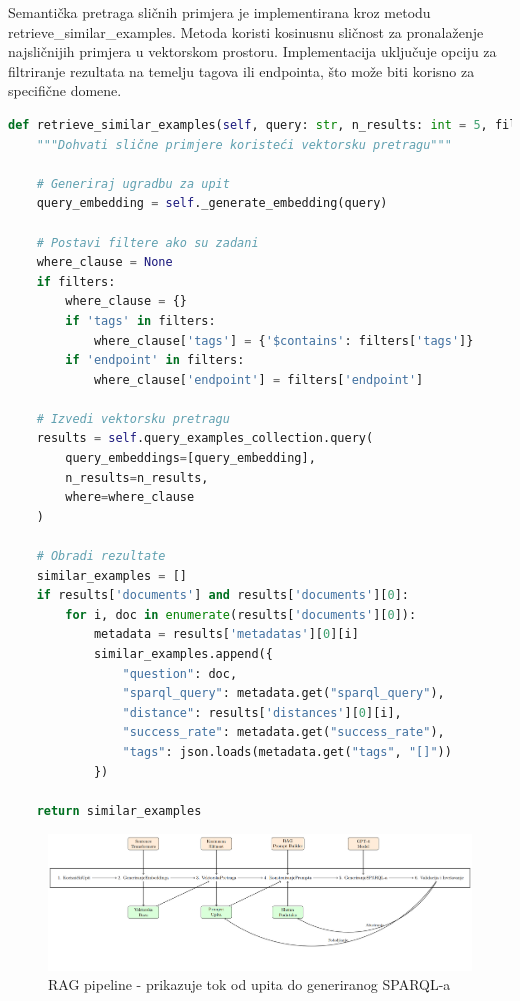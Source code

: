 Semantička pretraga sličnih primjera je implementirana kroz metodu retrieve\_similar\_examples. Metoda koristi kosinusnu sličnost za pronalaženje najsličnijih primjera u vektorskom prostoru. Implementacija uključuje opciju za filtriranje rezultata na temelju tagova ili endpointa, što može biti korisno za specifične domene.

\begin{lstlisting}[language=Python, caption=Implementacija semantičke pretrage]
def retrieve_similar_examples(self, query: str, n_results: int = 5, filters: Dict = None) -> List[Dict[str, Any]]:
    """Dohvati slične primjere koristeći vektorsku pretragu"""
    
    # Generiraj ugradbu za upit
    query_embedding = self._generate_embedding(query)
    
    # Postavi filtere ako su zadani
    where_clause = None
    if filters:
        where_clause = {}
        if 'tags' in filters:
            where_clause['tags'] = {'$contains': filters['tags']}
        if 'endpoint' in filters:
            where_clause['endpoint'] = filters['endpoint']
    
    # Izvedi vektorsku pretragu
    results = self.query_examples_collection.query(
        query_embeddings=[query_embedding],
        n_results=n_results,
        where=where_clause
    )
    
    # Obradi rezultate
    similar_examples = []
    if results['documents'] and results['documents'][0]:
        for i, doc in enumerate(results['documents'][0]):
            metadata = results['metadatas'][0][i]
            similar_examples.append({
                "question": doc,
                "sparql_query": metadata.get("sparql_query"),
                "distance": results['distances'][0][i],
                "success_rate": metadata.get("success_rate"),
                "tags": json.loads(metadata.get("tags", "[]"))
            })
    
    return similar_examples
\end{lstlisting}

\begin{figure}[h!]
    \centering
    \includegraphics[width=1\textwidth]{figures/rag_pipeline.png}
    \caption{RAG pipeline - prikazuje tok od upita do generiranog SPARQL-a}
    \label{fig:rag_pipeline}
\end{figure}

